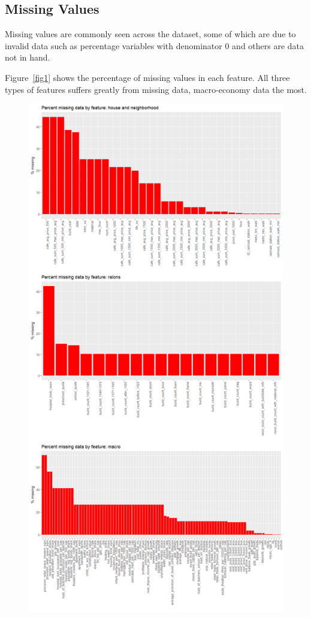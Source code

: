 \documentclass{article}
\begin{document}
\subsection{Missing Values}

Missing values are commonly seen across the dataset, some of which are due to invalid data such as percentage variables with denominator 0 and others are data not in hand.

Figure~\ref{fig1} shows the percentage of missing values in each feature. All three types of features suffers greatly from missing data, macro-economy data the most.

\begin{figure}[ht]
\vskip 0.2in
\begin{center}
\centerline{\includegraphics[width=\columnwidth]{missing}}

\end{center}
\end{figure}
\end{document}
